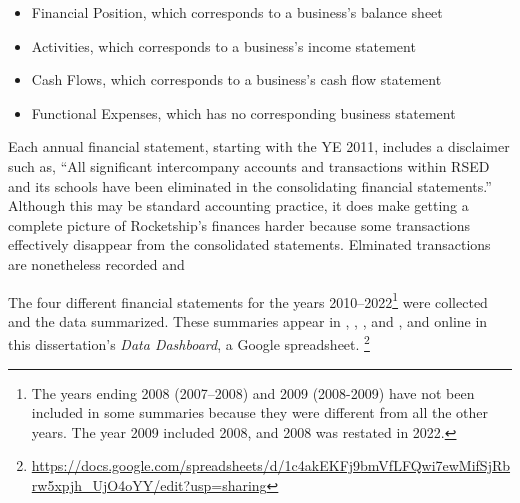 \begin{itemize}
  \item Financial Position, which corresponds to a business's balance sheet\\
  \item Activities, which corresponds to a business's income statement\\
  \item Cash Flows, which corresponds to a business's cash flow statement\\
  \item Functional Expenses, which has no corresponding business statement\\
\end{itemize}

Each annual financial statement, starting with the YE 2011, includes a disclaimer such as, ``All significant intercompany accounts and transactions within RSED and its schools have been eliminated in the consolidating financial statements.'' Although this may be standard accounting practice, it does make getting a complete picture of Rocketship's finances harder because some transactions effectively disappear from the consolidated statements. Elminated transactions are nonetheless recorded and   

The four different financial statements for the years 2010–2022\footnote{The years ending 2008 (2007–2008) and 2009 (2008-2009) have not been included in some summaries because they were different from all the other years. The year 2009 included 2008, and 2008 was restated in 2022.} were collected and the data summarized. These summaries appear in , , , and , and online in this dissertation's \textit{Data Dashboard}, a Google spreadsheet.%
\footnote{\url{https://docs.google.com/spreadsheets/d/1c4akEKFj9bmVfLFQwi7ewMifSjRbrw5xpjh_UjO4oYY/edit?usp=sharing}}

